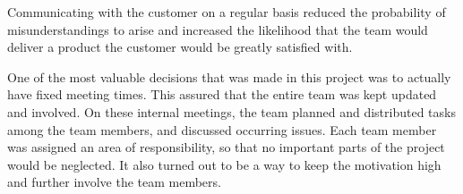 Communicating with the customer on a regular basis reduced the probability of misunderstandings to arise and increased the likelihood that the team would deliver a product the customer would be greatly satisfied with. 

One of the most valuable decisions that was made in this project was to actually have fixed meeting times. This assured that the entire team was kept updated and involved. On these internal meetings, the team planned and distributed tasks among the team members, and discussed occurring issues. Each team member was assigned an area of responsibility, so that no important parts of the project would be neglected. It also turned out to be a way to keep the motivation high and further involve the team members.
